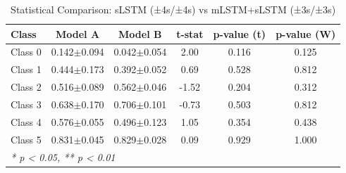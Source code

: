 \begin{table}[htbp]
\centering
\caption{Statistical Comparison: sLSTM (±4s/±4s) vs mLSTM+sLSTM (±3s/±3s)}
\label{tab:comparison_class_slstm_±4s_±4s_vs_mlstmslstm_±3s_±3s}
\begin{tabular}{lccccc}
\toprule
\textbf{Class} & \textbf{Model A} & \textbf{Model B} & \textbf{t-stat} & \textbf{p-value (t)} & \textbf{p-value (W)} \\
\midrule
Class 0 & 0.142$\pm$0.094 & 0.042$\pm$0.054 & 2.00 & 0.116 & 0.125 \\
Class 1 & 0.444$\pm$0.173 & 0.392$\pm$0.052 & 0.69 & 0.528 & 0.812 \\
Class 2 & 0.516$\pm$0.089 & 0.562$\pm$0.046 & -1.52 & 0.204 & 0.312 \\
Class 3 & 0.638$\pm$0.170 & 0.706$\pm$0.101 & -0.73 & 0.503 & 0.812 \\
Class 4 & 0.576$\pm$0.055 & 0.496$\pm$0.123 & 1.05 & 0.354 & 0.438 \\
Class 5 & 0.831$\pm$0.045 & 0.829$\pm$0.028 & 0.09 & 0.929 & 1.000 \\
\bottomrule
\multicolumn{6}{l}{\textit{* p < 0.05, ** p < 0.01}} \\
\end{tabular}
\end{table}